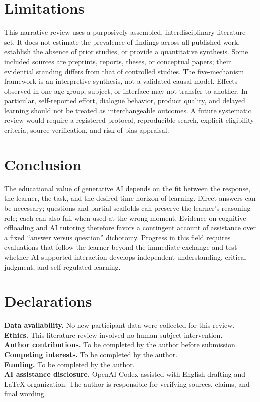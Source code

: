 \documentclass[11pt,a4paper]{article}
\begin{document}
\section{Limitations}
This narrative review uses a purposively assembled, interdisciplinary literature set. It does not estimate the prevalence of findings across all published work, establish the absence of prior studies, or provide a quantitative synthesis. Some included sources are preprints, reports, theses, or conceptual papers; their evidential standing differs from that of controlled studies. The five-mechanism framework is an interpretive synthesis, not a validated causal model. Effects observed in one age group, subject, or interface may not transfer to another. In particular, self-reported effort, dialogue behavior, product quality, and delayed learning should not be treated as interchangeable outcomes. A future systematic review would require a registered protocol, reproducible search, explicit eligibility criteria, source verification, and risk-of-bias appraisal.

\section{Conclusion}
The educational value of generative AI depends on the fit between the response, the learner, the task, and the desired time horizon of learning. Direct answers can be necessary; questions and partial scaffolds can preserve the learner's reasoning role; each can also fail when used at the wrong moment. Evidence on cognitive offloading and AI tutoring therefore favors a contingent account of assistance over a fixed ``answer versus question'' dichotomy. Progress in this field requires evaluations that follow the learner beyond the immediate exchange and test whether AI-supported interaction develops independent understanding, critical judgment, and self-regulated learning.



\section*{Declarations}
\noindent\textbf{Data availability.} No new participant data were collected for this review.\\
\textbf{Ethics.} This literature review involved no human-subject intervention.\\
\textbf{Author contributions.} To be completed by the author before submission.\\
\textbf{Competing interests.} To be completed by the author.\\
\textbf{Funding.} To be completed by the author.\\
\textbf{AI assistance disclosure.} OpenAI Codex assisted with English drafting and LaTeX organization. The author is responsible for verifying sources, claims, and final wording.
\end{document}
